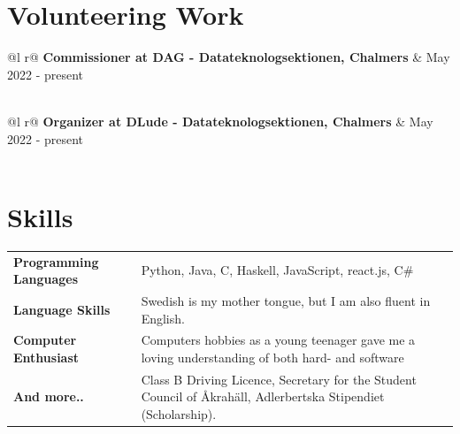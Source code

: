 \documentclass[a4paper,12pt]{article}
\begin{document}
\section{Volunteering Work}

\begin{tabularx}{\linewidth}{ @{}l r@{} }
\textbf{Commissioner at \textbf{DAG - Datateknologsektionen, Chalmers}} & \hfill May 2022 - present \\[3.75pt]
  \\
\end{tabularx}

\begin{tabularx}{\linewidth}{ @{}l r@{} }
\textbf{Organizer at \textbf{DLude - Datateknologsektionen, Chalmers}} & \hfill May 2022 - present \\[3.75pt]
  \\
\end{tabularx}



\section{Skills}

\begin{tabularx}{\linewidth}{@{}l X@{}}
\textbf{Programming Languages} &  \normalsize{Python, Java, C, Haskell, JavaScript, react.js, C\#}\\
\textbf{Language Skills}  &  \normalsize{Swedish is my mother tongue, but I am also fluent in English.}\\
\textbf{Computer Enthusiast}  &  \normalsize{Computers hobbies as a young teenager gave me a loving understanding of both hard- and software} \\
\textbf{And more..}  &  \normalsize{Class B Driving Licence, Secretary for the Student Council of Åkrahäll, Adlerbertska Stipendiet (Scholarship).}
\end{tabularx}

\vfill
\end{document}
